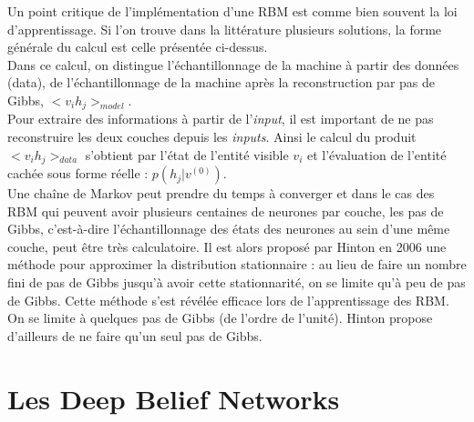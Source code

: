 \documentclass[a4paper,oneside]{report}
\begin{document}
                Un point critique de l'implémentation d'une RBM est comme bien souvent la loi 
d'apprentissage.
                Si l'on trouve dans la littérature plusieurs solutions, la forme générale du calcul 
est celle présentée ci-dessus.\\

                Dans ce calcul, on distingue l'échantillonnage de la machine à partir des données 
(data), de l'échantillonnage de la machine après la reconstruction par pas de Gibbs, 
\begin{math}<v_{i}h_{j}>_{model}\end{math}.\\
                
                Pour extraire des informations à partir de l'\textit{input}, il est important de ne 
pas reconstruire les deux couches depuis les \textit{inputs}.
                Ainsi le calcul du produit \begin{math}<v_{i}h_{j}>_{data}\end{math} s'obtient par 
l'état de l'entité visible \begin{math}v_{i}\end{math} et l'évaluation de l'entité 
cachée sous forme réelle 
: \begin{math}p(h_{j}|v^{(0)})\end{math}.\\

Une chaîne de Markov peut prendre du temps à converger et dans le cas des RBM qui peuvent 
avoir plusieurs centaines de neurones par couche, les pas de Gibbs, c'est-à-dire l'échantillonnage
 des états des neurones au sein d'une même couche, peut être très calculatoire. Il est alors proposé par 
Hinton en 2006 une méthode pour approximer la distribution stationnaire : au lieu de faire un nombre
 fini de pas de Gibbs jusqu'à avoir cette stationnarité, on se limite qu'à peu de pas de Gibbs. Cette 
méthode s'est révélée efficace lors de l'apprentissage des RBM. On se limite à quelques pas de Gibbs (de l'ordre de l'unité).
Hinton propose d'ailleurs de ne faire qu'un seul pas de Gibbs.







                				

        \chapter{Les Deep Belief Networks}
\end{document}
